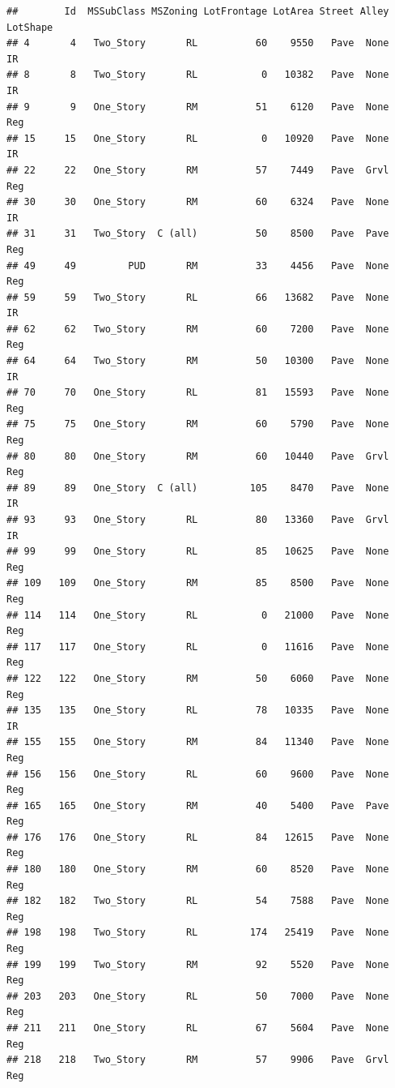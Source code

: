 \documentclass[]{article}
\begin{document}
\begin{verbatim}
##        Id  MSSubClass MSZoning LotFrontage LotArea Street Alley LotShape
## 4       4   Two_Story       RL          60    9550   Pave  None       IR
## 8       8   Two_Story       RL           0   10382   Pave  None       IR
## 9       9   One_Story       RM          51    6120   Pave  None      Reg
## 15     15   One_Story       RL           0   10920   Pave  None       IR
## 22     22   One_Story       RM          57    7449   Pave  Grvl      Reg
## 30     30   One_Story       RM          60    6324   Pave  None       IR
## 31     31   Two_Story  C (all)          50    8500   Pave  Pave      Reg
## 49     49         PUD       RM          33    4456   Pave  None      Reg
## 59     59   Two_Story       RL          66   13682   Pave  None       IR
## 62     62   Two_Story       RM          60    7200   Pave  None      Reg
## 64     64   Two_Story       RM          50   10300   Pave  None       IR
## 70     70   One_Story       RL          81   15593   Pave  None      Reg
## 75     75   One_Story       RM          60    5790   Pave  None      Reg
## 80     80   One_Story       RM          60   10440   Pave  Grvl      Reg
## 89     89   One_Story  C (all)         105    8470   Pave  None       IR
## 93     93   One_Story       RL          80   13360   Pave  Grvl       IR
## 99     99   One_Story       RL          85   10625   Pave  None      Reg
## 109   109   One_Story       RM          85    8500   Pave  None      Reg
## 114   114   One_Story       RL           0   21000   Pave  None      Reg
## 117   117   One_Story       RL           0   11616   Pave  None      Reg
## 122   122   One_Story       RM          50    6060   Pave  None      Reg
## 135   135   One_Story       RL          78   10335   Pave  None       IR
## 155   155   One_Story       RM          84   11340   Pave  None      Reg
## 156   156   One_Story       RL          60    9600   Pave  None      Reg
## 165   165   One_Story       RM          40    5400   Pave  Pave      Reg
## 176   176   One_Story       RL          84   12615   Pave  None      Reg
## 180   180   One_Story       RM          60    8520   Pave  None      Reg
## 182   182   Two_Story       RL          54    7588   Pave  None      Reg
## 198   198   Two_Story       RL         174   25419   Pave  None      Reg
## 199   199   Two_Story       RM          92    5520   Pave  None      Reg
## 203   203   One_Story       RL          50    7000   Pave  None      Reg
## 211   211   One_Story       RL          67    5604   Pave  None      Reg
## 218   218   Two_Story       RM          57    9906   Pave  Grvl      Reg

\end{verbatim}
\end{document}
